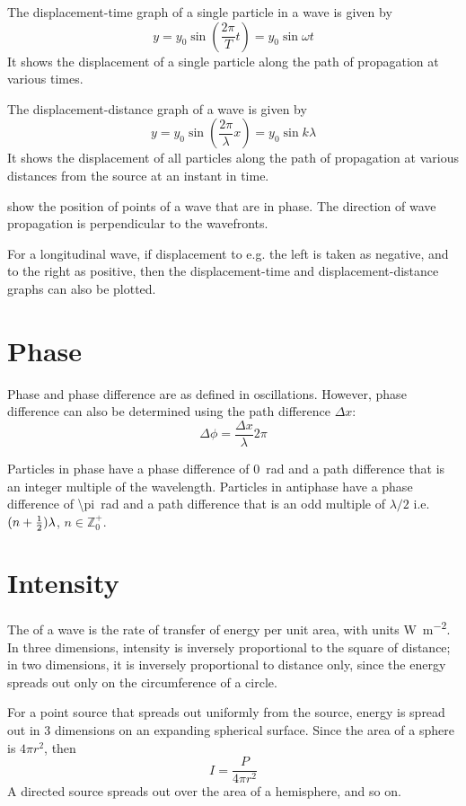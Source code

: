 \documentclass[Physics.tex]{subfiles}
\begin{document}
The displacement-time graph of a single particle in a wave is given by \begin{equation}y = y_0\sin(\frac{2\pi}{T}t) = y_0\sin\omega t\end{equation} It shows the displacement of a single particle along the path of propagation at various times.

The displacement-distance graph of a wave is given by \begin{equation}y = y_0\sin(\frac{2\pi}{\lambda}x) = y_0\sin k\lambda\end{equation} It shows the displacement of all particles along the path of propagation at various distances from the source at an instant in time.

 show the position of points of a wave that are in phase. The direction of wave propagation is perpendicular to the wavefronts.

For a longitudinal wave, if displacement to e.g. the left is taken as negative, and to the right as positive, then the displacement-time and displacement-distance graphs can also be plotted.
\section{Phase}
Phase and phase difference are as defined in oscillations. However, phase difference can also be determined using the path difference \(\Delta x\): \begin{equation}\Delta\phi = \frac{\Delta x}{\lambda}2\pi\end{equation}

Particles in phase have a phase difference of \SI{0}{\radian} and a path difference that is an integer multiple of the wavelength. Particles in antiphase have a phase difference of \SI{\pi}{\radian} and a path difference that is an odd multiple of \(\lambda/2\) i.e. \((n + \smash{\frac{1}{2}})\lambda\), \(n \in \mathbb{Z}^+_0\).
\section{Intensity}
The  of a wave is the rate of transfer of energy per unit area, with units \si{\watt\per\square\metre}. In three dimensions, intensity is inversely proportional to the square of distance; in two dimensions, it is inversely proportional to distance only, since the energy spreads out only on the circumference of a circle.

For a point source that spreads out uniformly from the source, energy is spread out in 3 dimensions on an expanding spherical surface. Since the area of a sphere is \(4\pi r^2\), then \begin{equation}I = \frac{P}{4\pi r^2}\end{equation} A directed source spreads out over the area of a hemisphere, and so on.
\end{document}
